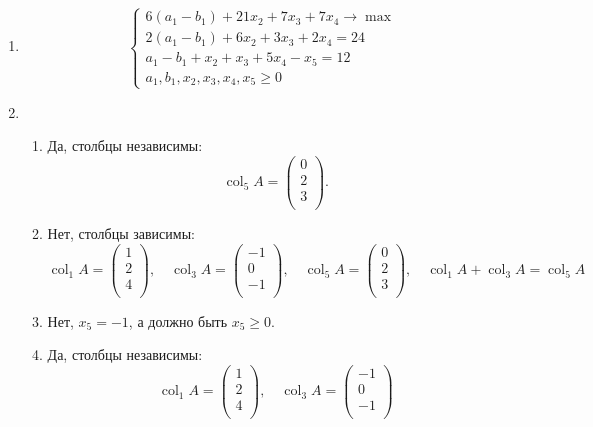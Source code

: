 \documentclass[12pt]{article}
\DeclareMathOperator{\col}{col}
\begin{document}
\begin{enumerate}
\item 
\[
\begin{cases}
  6(a_1 - b_1) + 21x_2 + 7x_3 + 7x_4 \to \max \\
  2(a_1 - b_1) + 6x_2 + 3x_3 +2x_4 = 24 \\
  a_1 - b_1 + x_2 + x_3 + 5x_4 - x_5 = 12 \\
  a_1, b_1, x_2, x_3, x_4, x_5 \geq 0    
\end{cases}
\]

\item 
\begin{enumerate}
  \item Да, столбцы независимы:
  \[
  \col_5 A = \begin{pmatrix}
    0 \\ 
    2 \\ 
    3 \\
  \end{pmatrix}.
  \]
  \item Нет, столбцы зависимы:
  \[
  \col_1 A = \begin{pmatrix}
    1 \\
    2 \\
    4 \\
  \end{pmatrix}, \quad 
  \col_3 A = \begin{pmatrix}
    -1 \\
    0 \\
    -1 \\
  \end{pmatrix}, \quad 
  \col_5 A = \begin{pmatrix}
    0 \\ 
    2 \\ 
    3 \\
  \end{pmatrix}, \quad 
  \col_1 A + \col_3 A = \col_5 A
  \]
  \item Нет, $x_5  = -1$, а должно быть $x_5 \geq 0$. 
  \item Да, столбцы независимы:
  \[
    \col_1 A = \begin{pmatrix}
      1 \\
      2 \\
      4 \\
    \end{pmatrix}, \quad 
    \col_3 A = \begin{pmatrix}
      -1 \\
      0 \\
      -1 \\
    \end{pmatrix}
  \]

\end{enumerate}



\end{enumerate}
\end{document}
